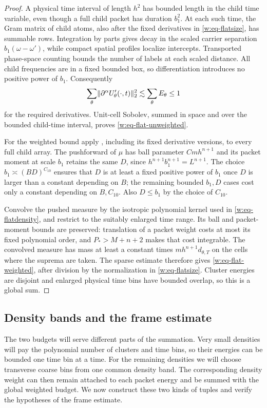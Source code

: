 \begin{proof}
A physical time interval of length $h^2$ has bounded length in the
child time variable, even though a full child packet has duration
$b_1^2$.  At each such time, the Gram matrix of child atoms, also after
the fixed derivatives in \eqref{w:eq-flatsize}, has summable rows.
Integration by parts gives decay in the scaled carrier separation
$b_1(\omega-\omega')$, while compact spatial profiles localize
intercepts.  Transported phase-space counting bounds the number of
labels at each scaled distance.  All child frequencies are in a fixed
bounded box, so differentiation introduces no positive power of $b_1$.
Consequently
\[
 \sum_\theta\lVert \partial^\alpha U'_\theta(\cdot,t)\rVert_2^2
 \lesssim\sum_\theta E_\theta\leq1
\]
for the required derivatives.  Unit-cell Sobolev, summed in space and
over the bounded child-time interval, proves
\eqref{w:eq-flat-unweighted}.

For the weighted bound apply , including its fixed
derivative versions, to every full child array.  The pushforward of
$\mu$ has ball parameter $Cmh^{n+1}$ and its packet moment at scale
$b_1$ retains the same $D$, since
$h^{n+1}b_1^{n+1}=L^{n+1}$.  The choice
$b_1\asymp(BD)^{C_{10}}$ ensures that $D$ is at least a fixed positive
power of $b_1$ once $D$ is larger than a constant depending on $B$;
the remaining bounded $b_1,D$ cases cost only a constant depending on
$B,C_{10}$.  Also $D\leq b_1$ by the choice of $C_{10}$.

Convolve the pushed measure by the isotropic polynomial kernel used
in \eqref{w:eq-flatdensity}, and restrict to the suitably enlarged
time range.  Its ball and packet-moment bounds are preserved: translation
of a packet weight costs at most its fixed polynomial order, and
$P_*>M+n+2$ makes that cost integrable.  The convolved measure has
mass at least a constant times $mh^{n+1}d_{\theta,T}$ on the cells
where the suprema are taken.  The sparse estimate therefore gives
\eqref{w:eq-flat-weighted}, after division by the normalization in
\eqref{w:eq-flatsize}.  Cluster energies are disjoint and enlarged
physical time bins have bounded overlap, so this is a global sum.
\end{proof}

\subsection{Density bands and the frame estimate}

The two budgets will serve different parts of the summation.  Very
small densities will pay the polynomial number of clusters and time
bins, so their energies can be bounded one time bin at a time.  For
the remaining densities we will choose transverse coarse bins from
one common density band.  The corresponding density weight can then
remain attached to each packet energy and be summed with the global
weighted budget.  We now construct these two kinds of tuples and verify the
hypotheses of the frame estimate.

